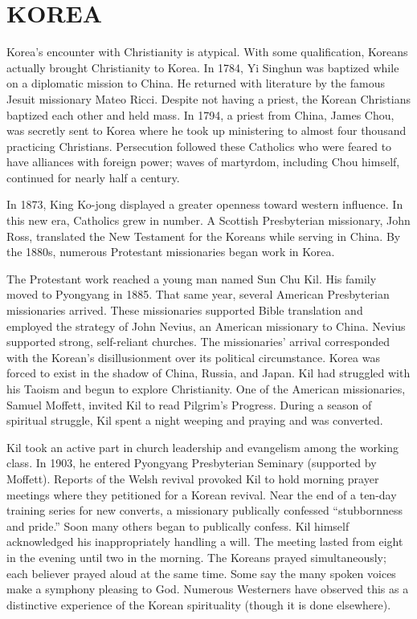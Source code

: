 \section{KOREA}

Korea’s encounter with Christianity is atypical. With some qualification, Koreans actually brought
Christianity to Korea. In 1784, Yi Singhun was baptized while on a diplomatic mission to China. He
returned with literature by the famous Jesuit missionary Mateo Ricci. Despite not having a priest,
the Korean Christians baptized each other and held mass. In 1794, a priest from China, James Chou,
was secretly sent to Korea where he took up ministering to almost four thousand practicing
Christians. Persecution followed these Catholics who were feared to have alliances with foreign
power; waves of martyrdom, including Chou himself, continued for nearly half a century.

In 1873, King Ko-jong displayed a greater openness toward western influence. In this new era,
Catholics grew in number. A Scottish Presbyterian missionary, John Ross, translated the New
Testament for the Koreans while serving in China. By the 1880s, numerous Protestant missionaries
began work in Korea.

The Protestant work reached a young man named Sun Chu Kil. His family moved to Pyongyang in 1885.
That same year, several American Presbyterian missionaries arrived. These missionaries supported
Bible translation and employed the strategy of John Nevius, an American missionary to China. Nevius
supported strong, self-reliant churches. The missionaries’ arrival corresponded with the Korean’s
disillusionment over its political circumstance. Korea was forced to exist in the shadow of China,
Russia, and Japan. Kil had struggled with his Taoism and begun to explore Christianity. One of the
American missionaries, Samuel Moffett, invited Kil to read Pilgrim’s Progress. During a season of
spiritual struggle, Kil spent a night weeping and praying and was converted.

Kil took an active part in church leadership and evangelism among the working class. In 1903, he
entered Pyongyang Presbyterian Seminary (supported by Moffett). Reports of the Welsh revival
provoked Kil to hold morning prayer meetings where they petitioned for a Korean revival. Near the
end of a ten-day training series for new converts, a missionary publically confessed “stubbornness
and pride.” Soon many others began to publically confess. Kil himself acknowledged his
inappropriately handling a will. The meeting lasted from eight in the evening until two in the
morning. The Koreans prayed simultaneously; each believer prayed aloud at the same time. Some say
the many spoken voices make a symphony pleasing to God. Numerous Westerners have observed this as a
distinctive experience of the Korean spirituality (though it is done elsewhere).

